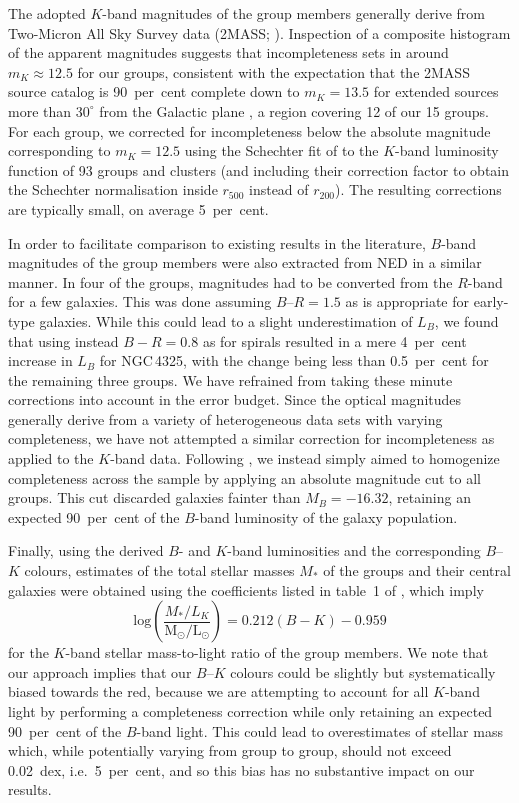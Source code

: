 \documentclass[useAMS,usenatbib]{mn2e}
\begin{document}
The adopted $K$-band magnitudes of the group members generally derive
from Two-Micron All Sky Survey data (2MASS; \citealt{skru06}).
Inspection of a composite histogram of the apparent magnitudes
suggests that incompleteness sets in around $m_K \approx 12.5$ for our
groups, consistent with the expectation that the 2MASS source catalog
is 90~per~cent complete down to $m_K = 13.5$ for extended sources more
than $30^{\circ}$ from the Galactic plane \citep{skru06}, a region
covering 12 of our 15 groups.  For each group, we corrected for
incompleteness below the absolute magnitude corresponding to $m_K
=12.5$ using the Schechter fit of \citet*{lin04b} to the $K$-band
luminosity function of 93 groups and clusters (and including their
correction factor to obtain the Schechter normalisation inside
$r_{500}$ instead of $r_{200}$). The resulting corrections are
typically small, on average 5~per~cent.

In order to facilitate comparison to existing results in the
literature, $B$-band magnitudes of the group members were also
extracted from NED in a similar manner.  In four of the groups,
magnitudes had to be converted from the $R$-band for a few
galaxies. This was done assuming $B$--$R=1.5$ as is appropriate for
early-type galaxies. While this could lead to a slight underestimation
of $L_B$, we found that using instead $B-R=0.8$ as for spirals
resulted in a mere 4~per~cent increase in $L_B$ for NGC\,4325, with
the change being less than 0.5~per~cent for the remaining three
groups. We have refrained from taking these minute corrections into
account in the error budget.  Since the optical magnitudes generally
derive from a variety of heterogeneous data sets with varying
completeness, we have not attempted a similar correction for
incompleteness as applied to the $K$-band data.  Following
\citet{osmo04}, we instead simply aimed to homogenize completeness
across the sample by applying an absolute magnitude cut to all
groups. This cut discarded galaxies fainter than $M_B=-16.32$,
retaining an expected 90~per~cent of the $B$-band luminosity of the
galaxy population.




Finally, using the derived $B$- and $K$-band luminosities and the
corresponding $B$--$K$ colours, estimates of the total stellar masses
$M_\ast$ of the groups and their central galaxies were obtained using
the coefficients listed in table~1 of \citet{bell01}, which imply
\begin{equation}
  \mbox{log} \left(\frac{M_\ast/L_K}{\mbox{M$_\odot$/L$_\odot$}}\right) =
  0.212(B-K) -0.959
  \label{eq,mstar}
\end{equation}
for the $K$-band stellar mass-to-light ratio of the group members. We
note that our approach implies that our $B$--$K$ colours could be
slightly but systematically biased towards the red, because we are
attempting to account for all $K$-band light by performing a
completeness correction while only retaining an expected 90~per~cent
of the $B$-band light. This could lead to overestimates of stellar
mass which, while potentially varying from group to group, should not
exceed 0.02~dex, i.e.\ 5~per~cent, and so this bias has no substantive
impact on our results.
\end{document}
